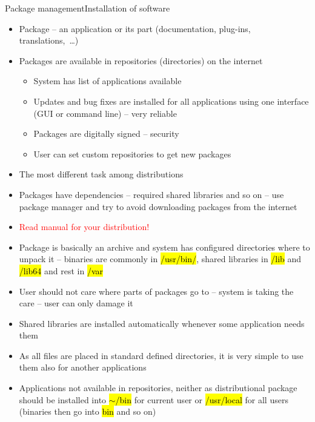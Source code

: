 \documentclass[compress, ucs, xelatex, 11pt, xcolor=svgnames,
  hyperref={
    bookmarks=true,
    unicode=true,
    colorlinks=true,
    pdftitle={Linux, command line and MetaCentrum},
    plainpages=false,
    pdfauthor={Vojtech Zeisek},
    pdfsubject={Course about use of Linux command line, writing shell scripts and using MetaCentrum of CESNET},
    pdfcreator={XeLaTeX},
    pdfkeywords={Linux, GNU, BASH, shell, command line, MetaCentrum},
    linkcolor=DarkRed,
    anchorcolor=DarkBlue,
    citecolor=Indigo,
    filecolor=NavyBlue,
    menucolor=DarkMagenta,
    urlcolor=DarkBlue,
    pdftex},
  url={hyphens, lowtilde} %
  ]{beamer}
\renewcommand{\texttt}[1]{\hl{\ttfamily #1}}
\renewcommand{\alert}[1]{\textcolor{red}{#1}}
\begin{document}
\begin{frame}[allowframebreaks]{Package management}{Installation of software}
  \begin{itemize}
    \item Package -- an application or its part (documentation, plug-ins, translations,~\ldots)
    \item Packages are available in repositories (directories) on the internet
    \begin{itemize}
      \item System has list of applications available
      \item Updates and bug fixes are installed for all applications using one interface (GUI or command line) -- very reliable
      \item Packages are digitally signed -- security
      \item User can set custom repositories to get new packages
    \end{itemize}
    \item The most different task among distributions
    \item Packages have dependencies -- required shared libraries and so on -- use package manager and try to avoid downloading packages from the internet
    \item \alert{Read manual for your distribution!}
    \item Package is basically an archive and system has configured directories where to unpack it -- binaries are commonly in \texttt{/usr/bin/}, shared libraries in \texttt{/lib} and \texttt{/lib64} and rest in \texttt{/var}
    \item User should not care where parts of packages go to -- system is taking the care -- user can only damage it
    \item Shared libraries are installed automatically whenever some application needs them
    \item As all files are placed in standard defined directories, it is very simple to use them also for another applications
    \item Applications not available in repositories, neither as distributional package should be installed into \texttt{$\sim$/bin} for current user or \texttt{/usr/local} for all users (binaries then go into \texttt{bin} and so on)
  \end{itemize}
\end{frame}
\end{document}
